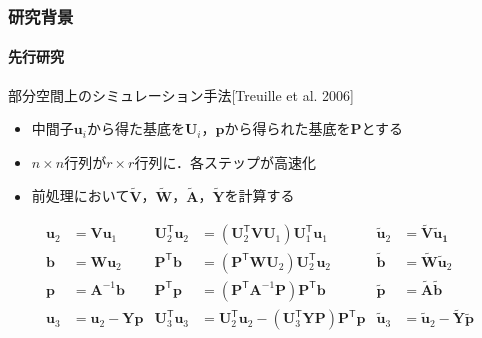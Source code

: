 \documentclass[aspectratio=169,dvipdfmx,hyperref={bookmarks=true}]{beamer}
\begin{document}
\begin{frame}
\frametitle{研究背景}
\framesubtitle{先行研究}
	\begin{block}{部分空間上のシミュレーション手法[Treuille et al. 2006]}
	   \begin{itemize}
   	\item 中間子$\bm{u}_i$から得た基底を$\bm{U}_i$，$\bm{p}$から得られた基底を$\bm{P}$とする
	\item $n\times n$行列が$r \times r$行列に．各ステップが高速化
	\item 前処理において$\bm{\widetilde{V}}$，$\bm{\widetilde{W}}$，$\bm{\widetilde{A}}$，$\bm{\widetilde{Y}}$を計算する
	\end{itemize}
\begin{align*}
 \bm{u}_2   		&=  \bm{V}\bm{u}_1&\bm{U}_2^{\mathsf T}\bm{u}_2	& = (\bm{U}_2^{\mathsf T}\bm{V}\bm{U}_1)\bm{U}_1^{\mathsf T}\bm{u}_1 					&\bm{\widetilde{u}}_2 		&= \bm{\widetilde{V}}\bm{\widetilde{u}_1}	\\
 \bm{b} 			&= \bm{W}\bm{u}_2&\bm{P}^{\mathsf T}\bm{b}		& = (\bm{P}^{\mathsf T}\bm{W}\bm{U}_2)\bm{U}_2^{\mathsf T}\bm{u}_2        				&\bm{\widetilde{b}}			&= \bm{\widetilde{W}}\bm{\widetilde{u}}_2	\\
 \bm{p} 			&= \bm{A}^{-1}\bm{b}&\bm{P}^{\mathsf T}\bm{p} 		&= (\bm{P}^{\mathsf T}\bm{A}^{-1}\bm{P})\bm{P}^{\mathsf T}\bm{b}						&\bm{\widetilde{p}}			&= \bm{\widetilde{A}}\bm{\widetilde{b}}\\
\bm{u}_3  			&= \bm{u}_2 - \bm{Y}\bm{p} &\bm{U}_3^{\mathsf T}\bm{u}_3 	&=  \bm{U}_2^{\mathsf T}\bm{u}_2 - (\bm{U}_3^{\mathsf T}\bm{Y}\bm{P})\bm{P}^{\mathsf T}\bm{p}	&\bm{\widetilde{u}}_3		&= \bm{\widetilde{u}}_2  -  \bm{\widetilde{Y}}\bm{\widetilde{p}}
\end{align*}
\end{block}
\end{frame}

\end{document}
